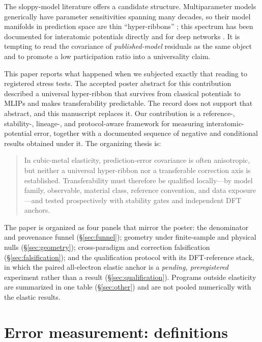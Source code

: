 \documentclass[11pt]{article}
\begin{document}
The sloppy-model literature offers a candidate structure. Multiparameter models generically have parameter sensitivities spanning many decades, so their model manifolds in prediction space are thin ``hyper-ribbons'' \citep{gutenkunst2007,transtrum2011,transtrum2015}; this spectrum has been documented for interatomic potentials directly \citep{frederiksen2004,wen2017,kurniawan2022} and for deep networks \citep{mao2024}. It is tempting to read the covariance of \emph{published-model} residuals as the same object and to promote a low participation ratio into a universality claim.

This paper reports what happened when we subjected exactly that reading to registered stress tests. The accepted poster abstract for this contribution described a universal hyper-ribbon that survives from classical potentials to MLIPs and makes transferability predictable. The record does not support that abstract, and this manuscript replaces it. Our contribution is a reference-, stability-, lineage-, and protocol-aware framework for measuring interatomic-potential error, together with a documented sequence of negative and conditional results obtained under it. The organizing thesis is:

\begin{quote}
In cubic-metal elasticity, prediction-error covariance is often anisotropic, but neither a universal hyper-ribbon nor a transferable correction axis is established. Transferability must therefore be qualified locally---by model family, observable, material class, reference convention, and data exposure---and tested prospectively with stability gates and independent DFT anchors.
\end{quote}

The paper is organized as four panels that mirror the poster: the denominator and provenance funnel (\S\ref{sec:funnel}); geometry under finite-sample and physical nulls (\S\ref{sec:geometry}); cross-paradigm and correction falsification (\S\ref{sec:falsification}); and the qualification protocol with its DFT-reference stack, in which the paired all-electron elastic anchor is a \emph{pending, preregistered} experiment rather than a result (\S\ref{sec:qualification}). Programs outside elasticity are summarized in one table (\S\ref{sec:other}) and are not pooled numerically with the elastic results.

\section{Error measurement: definitions}
\label{sec:definitions}
\end{document}
